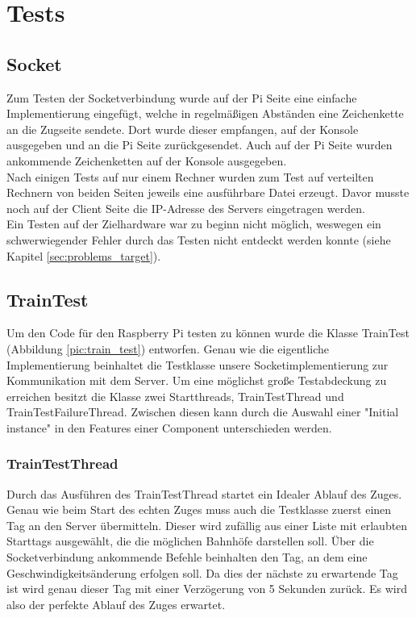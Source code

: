\chapter{Tests}

\section{Socket}

Zum Testen der Socketverbindung wurde auf der Pi Seite eine einfache Implementierung eingefügt, welche in regelmäßigen Abständen eine Zeichenkette an die Zugseite sendete. Dort wurde dieser empfangen, auf der Konsole ausgegeben und an die Pi Seite zurückgesendet. Auch auf der Pi Seite wurden ankommende Zeichenketten auf der Konsole ausgegeben.\\
Nach einigen Tests auf nur einem Rechner wurden zum Test auf verteilten Rechnern von beiden Seiten jeweils eine ausführbare Datei erzeugt. Davor musste noch auf der Client Seite die IP-Adresse des Servers eingetragen werden.\\
Ein Testen auf der Zielhardware war zu beginn nicht möglich, weswegen ein schwerwiegender Fehler durch das Testen nicht entdeckt werden konnte (siehe Kapitel \ref{sec:problems_target}).

\section{TrainTest}

Um den Code für den Raspberry Pi testen zu können wurde die Klasse TrainTest (Abbildung \ref{pic:train_test}) entworfen. Genau wie die eigentliche Implementierung beinhaltet die Testklasse unsere Socketimplementierung zur Kommunikation mit dem Server. Um eine möglichst große Testabdeckung zu erreichen besitzt die Klasse zwei Startthreads, TrainTestThread und TrainTestFailureThread. Zwischen diesen kann durch die Auswahl einer "Initial instance" in den Features einer Component unterschieden werden.

\subsection{TrainTestThread}

Durch das Ausführen des TrainTestThread startet ein Idealer Ablauf des Zuges. Genau wie beim Start des echten Zuges muss auch die Testklasse zuerst einen Tag an den Server übermitteln. Dieser wird zufällig aus einer Liste mit erlaubten Starttags ausgewählt, die die möglichen Bahnhöfe darstellen soll. Über die Socketverbindung ankommende Befehle beinhalten den Tag, an dem eine Geschwindigkeitsänderung erfolgen soll. Da dies der nächste zu erwartende Tag ist wird genau dieser Tag mit einer Verzögerung von 5 Sekunden zurück. Es wird also der perfekte Ablauf des Zuges erwartet.


